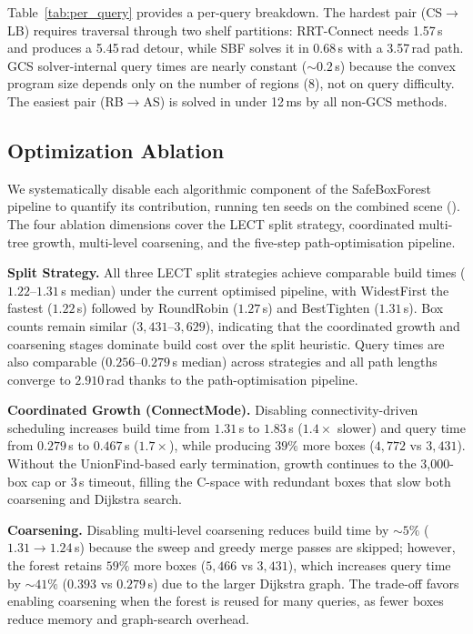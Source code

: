 \documentclass[journal]{IEEEtran}
\begin{document}
Table~\ref{tab:per_query} provides a per-query breakdown.
The hardest pair (CS$\to$LB) requires traversal through
two shelf partitions: RRT-Connect needs 1.57\,s and
produces a 5.45\,rad detour, while SBF solves it in 0.68\,s
with a 3.57\,rad path.
GCS solver-internal query times are nearly constant (${\sim}0.2$\,s)
because the convex program size depends only on the
number of regions (8), not on query difficulty.
The easiest pair (RB$\to$AS) is solved in under 12\,ms
by all non-GCS methods.

\subsection{Optimization Ablation}\label{sec:exp_ablation}

We systematically disable each algorithmic component of the SafeBoxForest
pipeline to quantify its contribution, running ten seeds on the combined
scene ().
The four ablation dimensions cover the LECT split strategy,
coordinated multi-tree growth, multi-level coarsening,
and the five-step path-optimisation pipeline.

\begin{table}[ht]
\centering
\caption{Ablation study (IIWA14).}
\label{tab:ablation}
\resizebox{\columnwidth}{!}{%

}
\end{table}

\textbf{Split Strategy.}
All three LECT split strategies achieve comparable build times
($1.22$--$1.31$\,s median) under the current optimised pipeline,
with WidestFirst the fastest ($1.22$\,s) followed by RoundRobin
($1.27$\,s) and BestTighten ($1.31$\,s).
Box counts remain similar ($3{,}431$--$3{,}629$),
indicating that the coordinated growth and coarsening stages
dominate build cost over the split heuristic.
Query times are also comparable ($0.256$--$0.279$\,s median) across
strategies and all path lengths converge to $2.910$\,rad thanks to
the path-optimisation pipeline.

\textbf{Coordinated Growth (ConnectMode).}
Disabling connectivity-driven scheduling increases build time from
$1.31$\,s to $1.83$\,s ($1.4{\times}$ slower) and query time from
$0.279$\,s to $0.467$\,s ($1.7{\times}$),
while producing $39\%$ more boxes ($4{,}772$ vs $3{,}431$).
Without the UnionFind-based early termination, growth continues to the
3{,}000-box cap or 3\,s timeout, filling the C-space with
redundant boxes that slow both coarsening and Dijkstra search.

\textbf{Coarsening.}
Disabling multi-level coarsening reduces build time by ${\sim}5\%$
($1.31\to1.24$\,s) because the sweep and greedy merge passes are
skipped; however, the forest retains $59\%$ more boxes ($5{,}466$ vs $3{,}431$),
which increases query time by ${\sim}41\%$ ($0.393$ vs $0.279$\,s)
due to the larger Dijkstra graph.
The trade-off favors enabling coarsening when the forest is reused for
many queries, as fewer boxes reduce memory and graph-search overhead.
\end{document}
